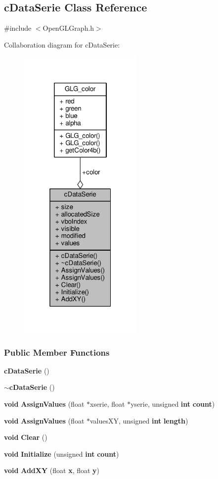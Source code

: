 \subsection{c\+Data\+Serie Class Reference}
\label{classcDataSerie}


{\ttfamily \#include $<$Open\+G\+L\+Graph.\+h$>$}



Collaboration diagram for c\+Data\+Serie\+:
\nopagebreak
\begin{figure}[H]
\begin{center}
\leavevmode
\includegraphics[width=172pt]{d2/d2b/classcDataSerie__coll__graph}
\end{center}
\end{figure}
\subsubsection*{Public Member Functions}
\begin{DoxyCompactItemize}
\item 
{\bf c\+Data\+Serie} ()
\item 
{\bf $\sim$c\+Data\+Serie} ()
\item 
{\bf void} {\bf Assign\+Values} (float $\ast$xserie, float $\ast$yserie, unsigned {\bf int} {\bf count})
\item 
{\bf void} {\bf Assign\+Values} (float $\ast$values\+XY, unsigned {\bf int} {\bf length})
\item 
{\bf void} {\bf Clear} ()
\item 
{\bf void} {\bf Initialize} (unsigned {\bf int} {\bf count})
\item 
{\bf void} {\bf Add\+XY} (float {\bf x}, float {\bf y})
\end{DoxyCompactItemize}
